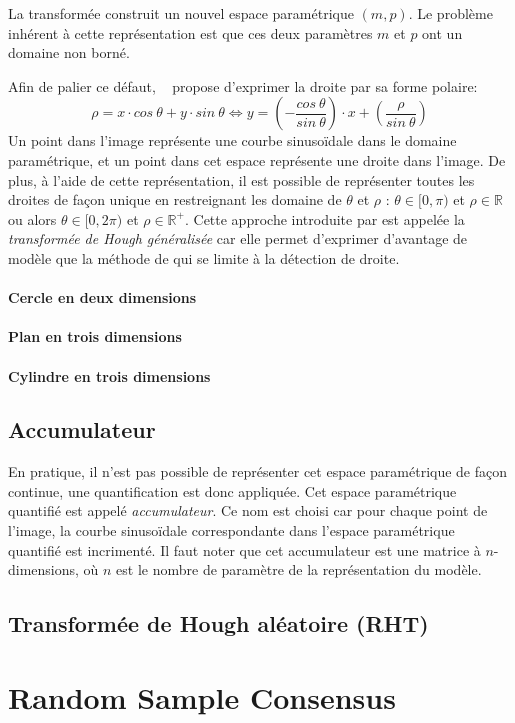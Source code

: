 La transformée construit un nouvel espace paramétrique $(m,p)$. Le problème inhérent à cette représentation est que ces deux paramètres $m$ et $p$ ont un domaine non borné.

Afin de palier ce défaut, \citeauthor{Duda1972}~\cite{Duda1972} propose d'exprimer la droite par sa forme polaire:
$$\rho = x \cdot cos~\theta + y \cdot sin~\theta \Leftrightarrow y=\left(-\frac{cos~\theta}{sin~\theta}\right) \cdot x + \left(\frac{\rho}{sin~\theta}\right)$$
Un point dans l'image représente une courbe sinusoïdale dans le domaine paramétrique, et un point dans cet espace représente une droite dans l'image.
De plus, à l'aide de cette représentation, il est possible de représenter toutes les droites de façon unique en restreignant les domaine de $\theta$ et $\rho$ : $\theta \in [0, \pi)$ et $\rho \in \mathbb{R}$ ou alors $\theta \in [0, 2 \pi)$ et $\rho \in \mathbb{R}^+$. Cette approche introduite par \citeauthor{Duda1972} est appelée la \emph{transformée de Hough généralisée} car elle permet d'exprimer d'avantage de modèle que la méthode de \cite{Hough1962} qui se limite à la détection de droite.

\paragraph{Cercle en deux dimensions}
\paragraph{Plan en trois dimensions}
\paragraph{Cylindre en trois dimensions}

\subsection{Accumulateur}
En pratique, il n'est pas possible de représenter cet espace paramétrique de façon continue, une quantification est donc appliquée. Cet espace paramétrique quantifié est appelé \emph{accumulateur}. Ce nom est choisi car pour chaque point de l'image, la courbe sinusoïdale correspondante dans l'espace paramétrique quantifié est incrimenté.
Il faut noter que cet accumulateur est une matrice à $n$-dimensions, où $n$ est le nombre de paramètre de la représentation du modèle.

\subsection{Transformée de Hough aléatoire (RHT)}

\section{Random Sample Consensus}
